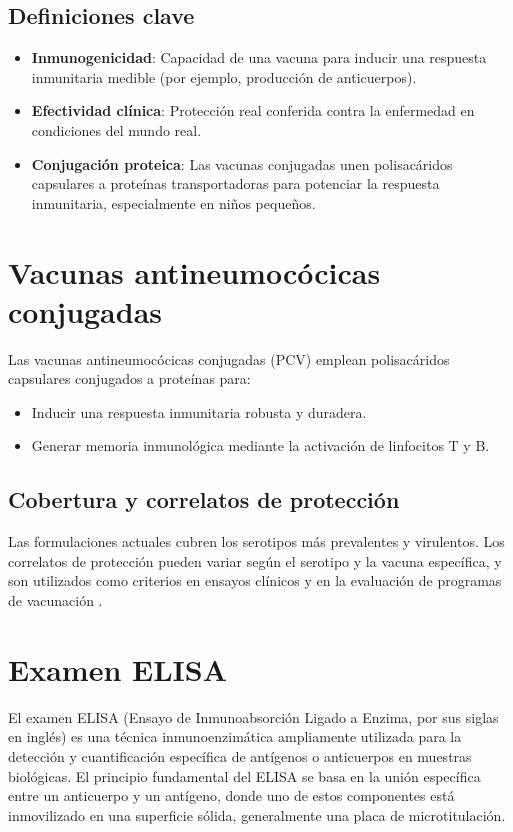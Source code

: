 \subsection{Definiciones clave}
\begin{itemize}
    \item \textbf{Inmunogenicidad}: Capacidad de una vacuna para inducir una respuesta inmunitaria medible (por ejemplo, producción de anticuerpos).
    \item \textbf{Efectividad clínica}: Protección real conferida contra la enfermedad en condiciones del mundo real.
    \item \textbf{Conjugación proteica}: Las vacunas conjugadas unen polisacáridos capsulares a proteínas transportadoras para potenciar la respuesta inmunitaria, especialmente en niños pequeños.
\end{itemize}

\section{Vacunas antineumocócicas conjugadas}


Las vacunas antineumocócicas conjugadas (PCV) emplean polisacáridos capsulares conjugados a proteínas para:
\begin{itemize}
    \item Inducir una respuesta inmunitaria robusta y duradera.
    \item Generar memoria inmunológica mediante la activación de linfocitos T y B.
\end{itemize}

\subsection{Cobertura y correlatos de protección}
Las formulaciones actuales cubren los serotipos más prevalentes y virulentos. Los correlatos de protección pueden variar según el serotipo y la vacuna específica, y son utilizados como criterios en ensayos clínicos y en la evaluación de programas de vacunación \cite{Snedecor2020a}.

\section{Examen ELISA}

El examen ELISA (Ensayo de Inmunoabsorción Ligado a Enzima, por sus siglas en inglés) es una técnica inmunoenzimática ampliamente utilizada para la detección y cuantificación específica de antígenos o anticuerpos en muestras biológicas. El principio fundamental del ELISA se basa en la unión específica entre un anticuerpo y un antígeno, donde uno de estos componentes está inmovilizado en una superficie sólida, generalmente una placa de microtitulación.

